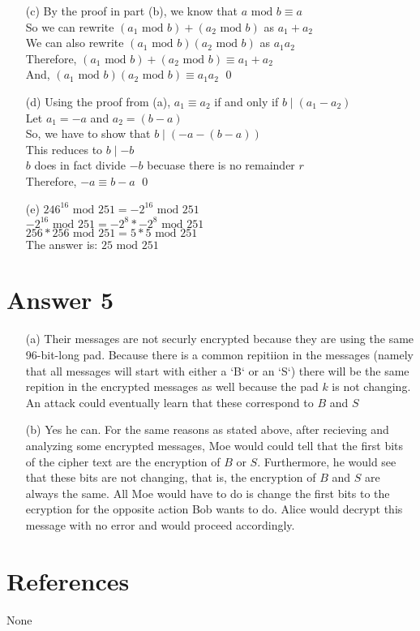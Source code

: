 \documentclass[11pt]{article}
\theoremstyle{definition}
\begin{document}
\begin{enumerate}
	\item[(c)]
	By the proof in part (b), we know that $a \text{ mod } b \equiv a$\\
	So we can rewrite $(a_1 \text{ mod } b) + (a_2 \text { mod } b)$ as $a_1 + a _2$\\
	We can also rewrite $(a_1 \text{ mod } b)(a_2 \text{ mod } b)$ as $a_1a_2$\\
	Therefore, $(a_1 \text{ mod } b) + (a_2 \text { mod } b) \equiv a_1 + a_2$\\
	And, $(a_1 \text{ mod } b)(a_2 \text{ mod } b) \equiv a_1a_2$ \qed

	\item[(d)]
	Using the proof from (a), $a_1 \equiv a_2$ if and only if $b \mid (a_1 - a_2)$\\
	Let $a_1 = -a$ and $a_2 = (b - a)$\\
	So, we have to show that $b \mid (-a - (b - a))$\\
	This reduces to $b \mid -b$\\
	$b$ does in fact divide $-b$ becuase there is no remainder $r$\\
	Therefore, $-a \equiv b - a$ \qed

	\item[(e)]
	$246^{16} \text{ mod } 251 = -2^{16} \text{ mod } 251$\\
	$-2^{16} \text{ mod } 251 = -2^{8} * -2^{8} \text{ mod } 251$\\
	$256 * 256 \text{ mod } 251 = 5 * 5 \text{ mod } 251$\\
	The answer is: $25 \text{ mod } 251$


\end{enumerate}

\section*{Answer 5}

	\begin{enumerate}
		\item[(a)] Their messages are not securly encrypted because they are using the same 96-bit-long pad.  Because there is a common repitiion in the messages (namely that all messages will start with either a `B` or an `S`) there will be the same repition in the encrypted messages as well because the pad $k$ is not changing.  An attack could eventually learn that these correspond to $B$ and $S$

		\item[(b)] Yes he can.  For the same reasons as stated above, after recieving and analyzing some encrypted messages, Moe would could tell that the first bits of the cipher text are the encryption of $B$ or $S$.  Furthermore, he would see that these bits are not changing, that is, the encryption of $B$ and $S$ are always the same.  All Moe would have to do is change the first bits to the ecryption for the opposite action Bob wants to do.  Alice would decrypt this message with no error and would proceed accordingly.
	\end{enumerate}


\noindent\hrulefill


\section*{References}

None
\end{document}
